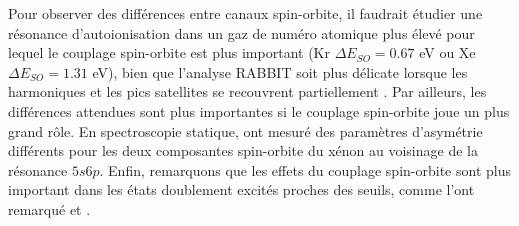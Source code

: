 Pour observer des différences entre canaux spin-orbite, il faudrait étudier une résonance d'autoionisation dans un gaz de numéro atomique plus élevé pour lequel le couplage spin-orbite est plus important (Kr $\Delta E_{SO} = 0.67$ eV ou Xe $\Delta E_{SO} = 1.31$ eV), bien que l'analyse RABBIT soit plus délicate lorsque les harmoniques et les pics satellites se recouvrent partiellement . Par ailleurs, les différences attendues sont plus importantes si le couplage spin-orbite joue un plus grand rôle. En spectroscopie statique,  ont mesuré des paramètres d'asymétrie différents pour les deux composantes spin-orbite du xénon au voisinage de la résonance $5s6p$. Enfin, remarquons que les effets du couplage spin-orbite sont plus important dans les états doublement excités proches des seuils, comme l'ont remarqué  et .



